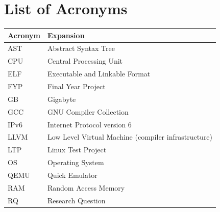 \documentclass[12pt, a4paper, oneside]{book}
\begin{document}
\newpage

\tableofcontents
\newpage

\listoffigures
\newpage

\listoftables
\newpage

\chapter*{List of Acronyms}

\begin{tabularx}{\textwidth}{L{3cm} X}
\toprule
\textbf{Acronym} & \textbf{Expansion} \\
\midrule
AST    & Abstract Syntax Tree \\
CPU    & Central Processing Unit \\
ELF    & Executable and Linkable Format \\
FYP    & Final Year Project \\
GB     & Gigabyte \\
GCC    & GNU Compiler Collection \\
IPv6   & Internet Protocol version 6 \\
LLVM   & Low Level Virtual Machine (compiler infrastructure) \\
LTP    & Linux Test Project \\
OS     & Operating System \\
QEMU   & Quick Emulator \\
RAM    & Random Access Memory \\
RQ     & Research Question \\
\bottomrule
\end{tabularx}

\newpage
\mainmatter
{}
\end{document}
